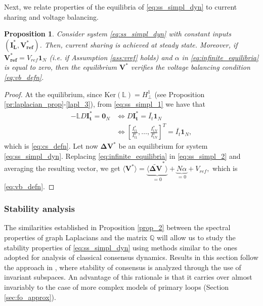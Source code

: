 \documentclass[a4paper]{article}
\theoremstyle{plain}
\newtheorem{prp}{Proposition}
\begin{document}
Next, we relate properties of
the equilibria of \eqref{eq:ss_simpl_dyn} to current sharing and voltage balancing.
\begin{prp}
	\label{prop:volt_bal}
	Consider system \eqref{eq:ss_simpl_dyn} with constant inputs
	$(\mathbf{I_{L}^*},\mathbf{ V_{ref}^*})$. Then, current sharing is achieved at steady state. Moreover, if $\mathbf{V_{ref}^*} =
	V_{ref}\mathbf{1}_N$ (i.e. if Assumption \ref{ass:vref} holds) and $\alpha$
	in \eqref{eq:infinite_equilibria} is equal to zero, then the
	equilibrium $\mathbf{V^{*}}$ verifies the voltage balancing condition \eqref{eq:vb_defn}.
\end{prp}
\begin{proof}
	At the equilibrium, since $\mathrm{Ker}(\mathbb{L}) = H_{\perp}^1$ (see Proposition \ref{pr:laplacian_prop}-\eqref{lapl_3}), from \eqref{eq:ss_simpl_1} we have that 
	\begin{equation}
	\label{eq:I_curr_sharing}
	\begin{aligned}
	-\mathbb{L} D \mathbf{I_t^{*}}=\mathbf{0}_N &\Leftrightarrow D\mathbf{{I}_t^*} = \bar{I_{t}}\mathbf{1}_N\\
	&\Leftrightarrow  \left[
	\frac{I_{t1}^*}{I_{t1}^s},\dots,
	\frac{I_{tN}^*}{I_{tN}^s}\right]^T =\bar{I_{t}}\mathbf{1}_N,
	\end{aligned}
	\end{equation}
	which is \eqref{eq:cs_defn}. 
	Let now $\mathbf{{\Delta V}^{*}}$ be an equilibrium for system \eqref{eq:ss_simpl_dyn}. Replacing \eqref{eq:infinite_equilibria} in \eqref{eq:ss_simpl_2} and averaging the resulting vector, we get
	$ \langle \mathbf{V^*}\rangle = \underbrace{\langle \mathbf{\widetilde{\Delta V}^*}\rangle}_{=0} +\underbrace{N\alpha}_{=0}+V_{ref},$ which is \eqref{eq:vb_defn}.
\end{proof}
\subsubsection{Stability analysis}
\label{sec:st_an_1}
The similarities established in Proposition \ref{prop_2} between the spectral properties of graph Laplacians and the matrix $\mathbb{Q}$ will allow us to study the stability properties of \eqref{eq:ss_simpl_dyn} using methods similar to the ones adopted for analysis of classical consensus dynamics. Results in this section follow the approach in \cite{1643380}, where stability of consensus is analyzed through the use of invariant subspaces. An advantage of this rationale is that it carries over almost invariably to the case of more complex models of primary loops (Section \ref{sec:fo_approx}).
\end{document}
